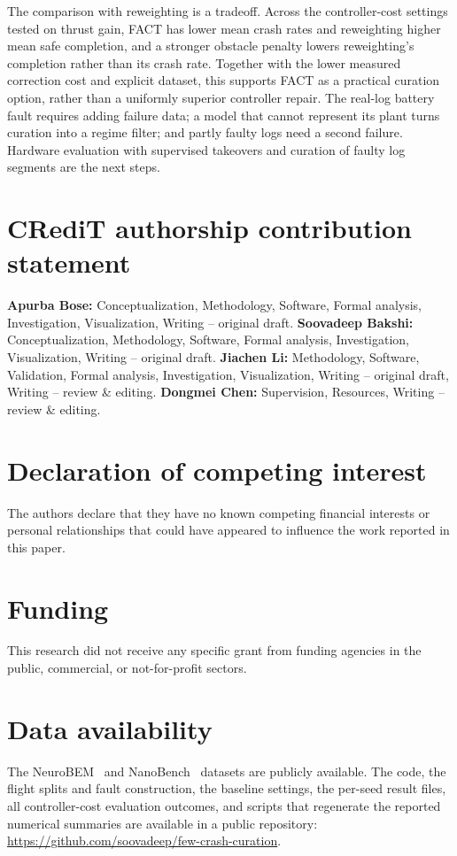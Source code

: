 \documentclass[preprint,12pt]{elsarticle}
\newcommand{\method}{FACT}
\begin{document}
The comparison with reweighting is a tradeoff. Across the controller-cost settings tested on thrust gain, \method{} has lower mean crash rates and reweighting higher mean safe completion, and a stronger obstacle penalty lowers reweighting's completion rather than its crash rate. Together with the lower measured correction cost and explicit dataset, this supports \method{} as a practical curation option, rather than a uniformly superior controller repair. The real-log battery fault requires adding failure data; a model that cannot represent its plant turns curation into a regime filter; and partly faulty logs need a second failure. Hardware evaluation with supervised takeovers and curation of faulty log segments are the next steps.

\section*{CRediT authorship contribution statement}
\textbf{Apurba Bose:} Conceptualization, Methodology, Software, Formal analysis, Investigation, Visualization, Writing -- original draft. \textbf{Soovadeep Bakshi:} Conceptualization, Methodology, Software, Formal analysis, Investigation, Visualization, Writing -- original draft. \textbf{Jiachen Li:} Methodology, Software, Validation, Formal analysis, Investigation, Visualization, Writing -- original draft, Writing -- review \& editing. \textbf{Dongmei Chen:} Supervision, Resources, Writing -- review \& editing.

\section*{Declaration of competing interest}
The authors declare that they have no known competing financial interests or personal relationships that could have appeared to influence the work reported in this paper.

\section*{Funding}
This research did not receive any specific grant from funding agencies in the public, commercial, or not-for-profit sectors.

\section*{Data availability}
The NeuroBEM~\citep{bauersfeld2021neurobem} and NanoBench~\citep{ullah2026nanobench} datasets are publicly available. The code, the flight splits and fault construction, the baseline settings, the per-seed result files, all \CostDives{} controller-cost evaluation outcomes, and scripts that regenerate the reported numerical summaries are available in a public repository:\\ \url{https://github.com/soovadeep/few-crash-curation}.
\end{document}
